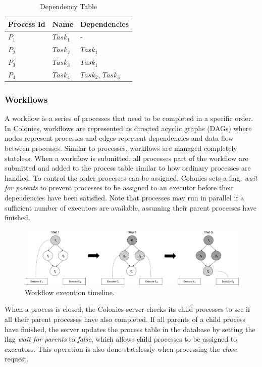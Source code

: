 \documentclass{article}
\begin{document}
\begin{table}[h]
	\caption{Dependency Table}
	\centering
	\begin{tabular}{lll}
		\toprule
		\cmidrule(r){1-2}
        Process Id & Name       & Dependencies           \\
		\midrule
        $P_{1}$    & $Task_{1}$ & -                      \\
        $P_{2}$    & $Task_{2}$ & $Task_{1}$             \\
        $P_{3}$    & $Task_{3}$ & $Task_{1}$             \\
        $P_{4}$    & $Task_{4}$ & $Task_{2}$, $Task_{3}$ \\
		\bottomrule
	\end{tabular}
	\label{deptable}
\end{table}

\subsubsection{Workflows}
A workflow is a series of processes that need to be completed in a specific order. In Colonies, workflows are represented as directed acyclic graphs (DAGs) where nodes represent processes and edges represent dependencies and data flow between processes. Similar to processes, workflows are managed completely stateless. When a workflow is submitted, all processes part of the workflow are submitted and added to the process table similar to how ordinary processes are handled. To control the order processes can be assigned, Colonies sets a flag, \emph{wait for parents} to prevent processes to be assigned to an executor before their dependencies have been satisfied. Note that processes may run in parallel if a sufficient number of executors are available, assuming their parent processes have finished.


\begin{figure}[h]
	\centering
    \includegraphics[scale=0.30]{workflow.png}
	\caption{Workflow execution timeline.}
	\label{fig:workflowexec}
\end{figure}

When a process is closed, the Colonies server checks its child processes to see if all their parent processes have also completed. If all parents of a child process have finished, the server updates the process table in the database by setting the flag \emph{wait for parents} to \emph{false}, which allows child processes to be assigned to executors. This operation is also done statelessly when processing the \emph{close} request. 
\end{document}
